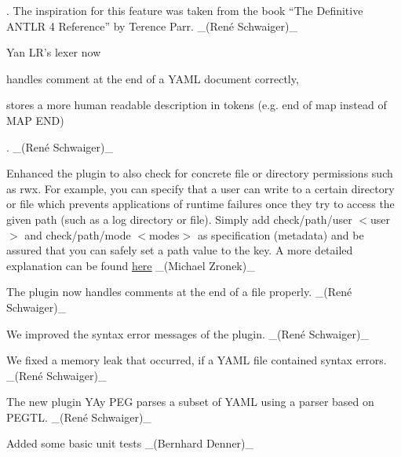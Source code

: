 . The inspiration for this feature was taken from the book “\+The Definitive A\+N\+T\+LR 4 Reference” by Terence Parr. \+\_\+(René Schwaiger)\+\_\+


\begin{DoxyItemize}
\item Yan L\+R’s lexer now
\begin{DoxyItemize}
\item handles comment at the end of a Y\+A\+ML document correctly,
\item stores a more human readable description in tokens (e.\+g. {\ttfamily end of map} instead of {\ttfamily M\+AP E\+ND})
\end{DoxyItemize}

. \+\_\+(René Schwaiger)\+\_\+
\end{DoxyItemize}

Enhanced the plugin to also check for concrete file or directory permissions such as {\ttfamily rwx}. For example, you can specify that a user can write to a certain directory or file which prevents applications of runtime failures once they try to access the given path (such as a log directory or file). Simply add {\ttfamily check/path/user $<$user$>$} and {\ttfamily check/path/mode $<$modes$>$} as specification (metadata) and be assured that you can safely set a path value to the key. A more detailed explanation can be found \mbox{\hyperlink{autotoc_md520_src_plugins_path_README_md}{here}} \+\_\+(\+Michael Zronek)\+\_\+


\begin{DoxyItemize}
\item The plugin now handles comments at the end of a file properly. \+\_\+(René Schwaiger)\+\_\+
\item We improved the syntax error messages of the plugin. \+\_\+(René Schwaiger)\+\_\+
\item We fixed a memory leak that occurred, if a Y\+A\+ML file contained syntax errors. \+\_\+(René Schwaiger)\+\_\+
\end{DoxyItemize}


\begin{DoxyItemize}
\item The new plugin Y\+Ay P\+EG parses a subset of Y\+A\+ML using a parser based on P\+E\+G\+TL. \+\_\+(René Schwaiger)\+\_\+
\end{DoxyItemize}


\begin{DoxyItemize}
\item Added some basic unit tests \+\_\+(\+Bernhard Denner)\+\_\+
\end{DoxyItemize}


